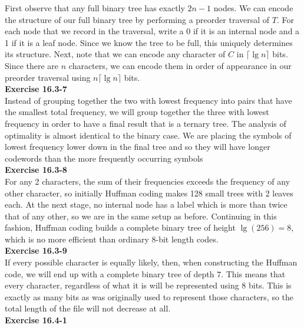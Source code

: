\documentclass{article}
\begin{document}
First observe that any full binary tree has exactly $2n-1$ nodes.  We can encode the structure of our full binary tree by performing a preorder traversal of $T$.  For each node that we record in the traversal, write a 0 if it is an internal node and a 1 if it is a leaf node. Since we know the tree to be full, this uniquely determines its structure.  Next, note that we can encode any character of $C$ in $\lceil \lg n \rceil$ bits. Since there are $n$ characters, we can encode them in order of appearance in our preorder traversal using $n\lceil \lg n \rceil$ bits. \\

\noindent\textbf{Exercise 16.3-7}\\

Instead of grouping together the two with lowest frequency into pairs that have the smallest total frequency, we will group together the three with lowest frequency in order to have a final result that is a ternary tree. The analysis of optimality is almost identical to the binary case. We are placing the symbols of lowest frequency lower down in the final tree and so they will have longer codewords than the more frequently occurring symbols\\

\noindent\textbf{Exercise 16.3-8}\\

For any 2 characters, the sum of their frequencies exceeds the frequency of any other character, so initially Huffman coding makes 128 small trees with 2 leaves each.  At the next stage, no internal node has a label which is more than twice that of any other, so we are in the same setup as before.  Continuing in this fashion, Huffman coding builds a complete binary tree of height $\lg(256) = 8$, which is no more efficient than ordinary 8-bit length codes. \\

\noindent\textbf{Exercise 16.3-9}\\

If every possible character is equally likely, then, when constructing the Huffman code, we will end up with a complete binary tree of depth $7$. This means that every character, regardless of what it is will be represented using $8$ bits. This is exactly as many bits as was originally used to represent those characters, so the total length of the file will not decrease at all.\\

\noindent\textbf{Exercise 16.4-1}\\
\end{document}
